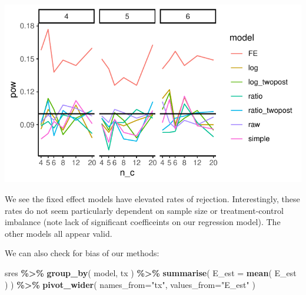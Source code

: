 \documentclass[
]{book}
\newenvironment{Shaded}{\begin{snugshade}}{\end{snugshade}}
\newcommand{\AttributeTok}[1]{\textcolor[rgb]{0.13,0.29,0.53}{#1}}
\newcommand{\DecValTok}[1]{\textcolor[rgb]{0.00,0.00,0.81}{#1}}
\newcommand{\FloatTok}[1]{\textcolor[rgb]{0.00,0.00,0.81}{#1}}
\newcommand{\FunctionTok}[1]{\textcolor[rgb]{0.13,0.29,0.53}{\textbf{#1}}}
\newcommand{\NormalTok}[1]{#1}
\newcommand{\SpecialCharTok}[1]{\textcolor[rgb]{0.81,0.36,0.00}{\textbf{#1}}}
\newcommand{\StringTok}[1]{\textcolor[rgb]{0.31,0.60,0.02}{#1}}
\begin{document}
\begin{Shaded}
\end{Shaded}

\begin{center}\includegraphics[width=0.75\linewidth]{Designing-Simulations-in-R_files/figure-latex/unnamed-chunk-261-1} \end{center}

We see the fixed effect models have elevated rates of rejection.
Interestingly, these rates do not seem particularly dependent on sample size or treatment-control imbalance (note lack of significant coefficeints on our regression model).
The other models all appear valid.

We can also check for bias of our methods:

\begin{Shaded}
\begin{Highlighting}[]
\NormalTok{sres }\SpecialCharTok{\%\textgreater{}\%} \FunctionTok{group\_by}\NormalTok{( model, tx ) }\SpecialCharTok{\%\textgreater{}\%}
  \FunctionTok{summarise}\NormalTok{( }\AttributeTok{E\_est =} \FunctionTok{mean}\NormalTok{( E\_est ) ) }\SpecialCharTok{\%\textgreater{}\%}
  \FunctionTok{pivot\_wider}\NormalTok{( }\AttributeTok{names\_from=}\StringTok{"tx"}\NormalTok{, }\AttributeTok{values\_from=}\StringTok{"E\_est"}\NormalTok{ )}
\end{Highlighting}
\end{Shaded}
\end{document}
